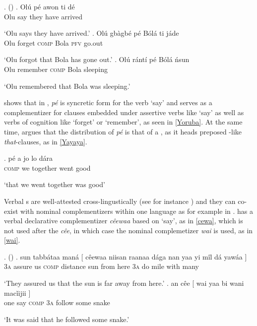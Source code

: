 \ex.  (\citealt[75]{Lawal1991})\label{Yoruba}
\ag. 
Ol\'u p\'e awon ti d\'e\\
Olu say they have arrived\\
\strut `Olu says they have arrived.'
\bg.
Ol\'u gb\`agb\'e p\'e B\'ol\'a ti j\'ade\\
Olu forget \textsc{comp} Bola \textsc{pfv} go.out\\
\strut `Olu forgot that Bola has gone out.'
\cg.
Ol\'u r\'ant\'i p\'e B\'ol\'a \'nsun\\
Olu remember \textsc{comp} Bola sleeping\\
\strut `Olu remembered that Bola was sleeping.' 

\citet{Lawal1991} shows that in , \textit{p\'e} is syncretic form for the verb `say' and serves as a complementizer for clauses embedded under assertive verbs like `say' as well as verbs of cognition like `forget' or \mbox{`remember',} as seen in \ref{Yoruba}. At the same time, \citet[76]{Lawal1991} argues that the distribution of \textit{p\'e} is that of a , as it heads preposed -like \textit{that}-clauses, as in \ref{Yayaya}.

\exg.
p\'e a jo lo d\'ara\\
\textsc{comp} we together went good\\
\strut `that we went together was good'\label{Yayaya}

Verbal s are well-attested cross-lingustically (see for instance \citealt{DixonAik2006}) and they can co-exist with nominal complementizers within one language as for example in .  has a verbal declarative complementizer \textit{c\^eewaa} based on `say', as in \ref{cewa}, which is not used after the   \textit{c\^ee}, in which case  the nominal complemetizer \textit{wai} is used, as in \ref{wai}.

\ex.  (\citealt[96--97]{Dimm1989})\label{Hausa}
\ag. sun tabb\'ataa man\'a [ c\^eewaa niisan raanaa d\'aga nan yaa yi m\^il d\'a {yaw\'aa ]}\\
\textsc{3a} assure us {} \textsc{comp} distance sun from here \textsc{3a} do mile with {many }\\
\strut `They assured us that the sun is far away from here.'\label{cewa}
\bg. an c\^ee [ wai yaa bi wani {mac\v{i}ijii ]}\\
one say {} \textsc{comp} \textsc{3a} follow some {snake }\\
\strut `It was said that he followed some snake.' \label{wai}

